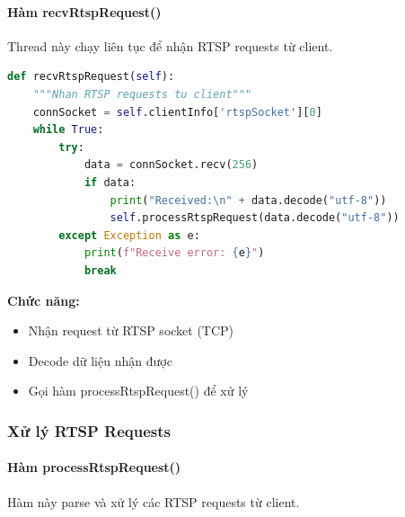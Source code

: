 \documentclass[a4paper,12pt]{article}
\begin{document}
\paragraph{Hàm recvRtspRequest()}
Thread này chạy liên tục để nhận RTSP requests từ client.

\begin{lstlisting}[language=Python, caption={Receive RTSP Request Thread}]
def recvRtspRequest(self):
    """Nhan RTSP requests tu client"""
    connSocket = self.clientInfo['rtspSocket'][0]
    while True:
        try:
            data = connSocket.recv(256)
            if data:
                print("Received:\n" + data.decode("utf-8"))
                self.processRtspRequest(data.decode("utf-8"))
        except Exception as e:
            print(f"Receive error: {e}")
            break
\end{lstlisting}

\textbf{Chức năng:}
\begin{itemize}
    \item Nhận request từ RTSP socket (TCP)
    \item Decode dữ liệu nhận được
    \item Gọi hàm processRtspRequest() để xử lý
\end{itemize}

\subsubsection{Xử lý RTSP Requests}

\paragraph{Hàm processRtspRequest()}
Hàm này parse và xử lý các RTSP requests từ client.
\end{document}
